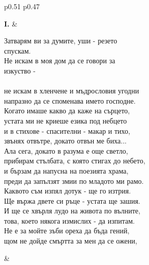 \documentclass[12pt,a4paper]{article}
\renewcommand{\arraystretch}{1.2}
\begin{document}
\begin{table}[h]
\centering
\renewcommand{\arraystretch}{1.2}

\begin{tabular}{p{0.51\textwidth} p{0.47\textwidth}}

\textbf{I.} & \\

\begin{minipage}[t]{\linewidth}
Затварям ви за думите, уши - резето \\спускам.\\
Не искам в моя дом да се говори за \\изкуство -\\
\\
не искам в хленчене и мъдрословия угодни\\
напразно да се споменава името господне.\\

Когато имаше какво да каже на сърцето,\\
устата ми не криеше езика под небцето\\

и в стихове - спасителни - макар и тихо,\\
звънях отвътре, докато отвън ме биха...\\

Ала сега, докато в разума е още светло,\\
прибирам стълбата, с която стигах до небето,\\

и бързам да напусна на поезията храма,\\
преди да запълзят змии по младото ми рамо.\\

Каквото съм изпял дотук - ще го изтрия.\\
Ще вържа двете си ръце - устата ще зашия.\\

И ще се хвърля лудо на живота по вълните,\\
това, което някога измислих - да изпитам.\\

Не е за мойте зъби ореха да бъда гений,\\
щом не дойде смъртта за мен да се ожени,\\
\end{minipage}

&

\begin{minipage}[t]{\linewidth}


\end{minipage}
\end{tabular}
\end{table}
\end{document}

